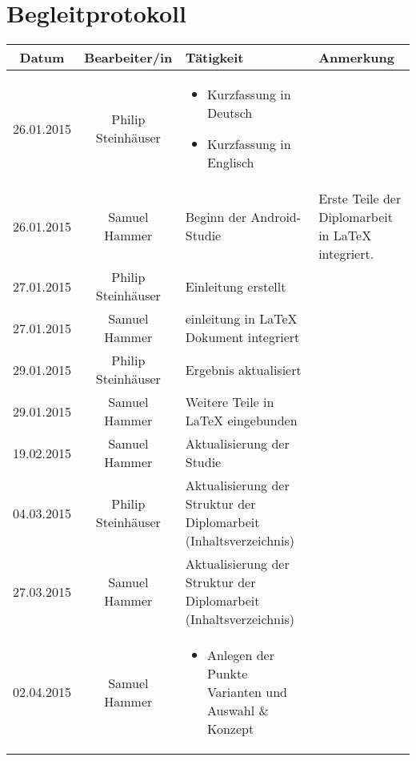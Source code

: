 \chapter{Begleitprotokoll}
\begin{table}
	\centering
	\begin{tabular}{| c | c | p{6cm} | p{4cm} |}
		\hline
		\textbf{Datum} & \textbf{Bearbeiter/in} & \textbf{Tätigkeit} & \textbf{Anmerkung}
		\\\hline %
		26.01.2015 
		&%
		Philip Steinhäuser
		&%
		\begin{itemize}
			\item Kurzfassung in Deutsch
			\item Kurzfassung in Englisch
		\end{itemize}
		&%
		\\\hline %
		26.01.2015
		&%
		Samuel Hammer
		&%
		Beginn der Android-Studie
		&%
		Erste Teile der Diplomarbeit in LaTeX integriert.
		\\\hline %
		27.01.2015
		&%
		Philip Steinhäuser
		&%
		Einleitung erstellt
		&%
		\\\hline %
		27.01.2015
		&%
		Samuel Hammer
		&%
		einleitung in LaTeX Dokument integriert
		&%
		\\\hline %
		29.01.2015
		&%
		Philip Steinhäuser
		&%
		Ergebnis aktualisiert
		&%
		\\\hline %
		29.01.2015
		&%
		Samuel Hammer
		&%
		Weitere Teile in LaTeX eingebunden
		&%
		\\\hline %
		19.02.2015
		&%
		Samuel Hammer
		&%
		Aktualisierung der Studie
		&%
		\\\hline %
		04.03.2015
		&%
		Philip Steinhäuser
		&%
		Aktualisierung der Struktur der Diplomarbeit (Inhaltsverzeichnis)
		&%
		\\\hline %
		27.03.2015
		&%
		Samuel Hammer
		&%
		Aktualisierung der Struktur der Diplomarbeit (Inhaltsverzeichnis)
		&%
		\\\hline %
		02.04.2015
		&%
		Samuel Hammer
		&%
		\begin{itemize}
			\item Anlegen der Punkte Varianten und Auswahl \& Konzept

\end{itemize}
\end{tabular}
\end{table}
